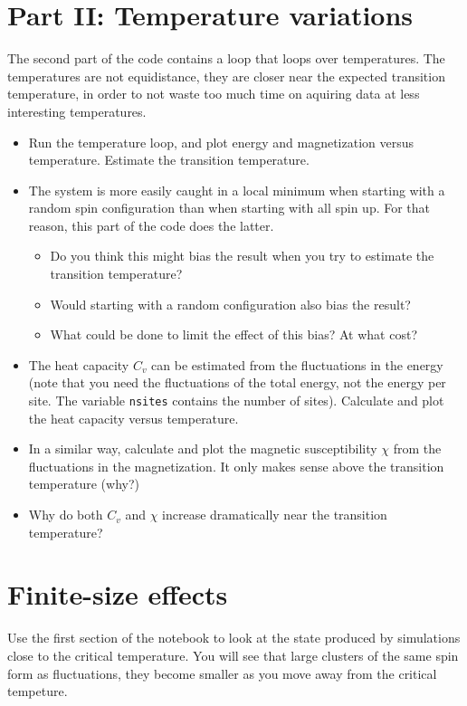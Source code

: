 \documentclass[a4paper,11pt]{article}
\begin{document}
\section{Part II: Temperature variations}

The second part of the code contains a loop that loops over
temperatures.  The temperatures are not equidistance, they are closer
near the expected transition temperature, in order to not waste too
much time on aquiring data at less interesting temperatures.

\begin{itemize}
\item Run the temperature loop, and plot energy and magnetization
  versus temperature.  Estimate the transition temperature.
\item The system is more easily caught in a local minimum when
  starting with a random spin configuration than when starting with
  all spin up.  For that reason, this part of the code does the
  latter.
  \begin{itemize}
  \item Do you think this might bias the result when you try to
    estimate the transition temperature?
  \item Would starting with a random configuration also bias the
    result?
    \item What could be done to limit the effect of this bias?  At
      what cost?
  \end{itemize}
\item The heat capacity $C_v$ can be estimated from the fluctuations
  in the energy (note that you need the fluctuations of the total
  energy, not the energy per site.  The variable \texttt{nsites}
  contains the number of sites).  Calculate and plot the heat capacity
  versus temperature.
\item In a similar way, calculate and plot the magnetic susceptibility
  $\chi$ from the fluctuations in the magnetization.  It only makes
  sense above the transition temperature (why?)
\item Why do both $C_v$ and $\chi$ increase dramatically near the
  transition temperature?
\end{itemize}

\section{Finite-size effects}

Use the first section of the notebook to look at the state produced by
simulations close to the critical temperature.  You will see that
large clusters of the same spin form as fluctuations, they become
smaller as you move away from the critical tempeture.
\end{document}
